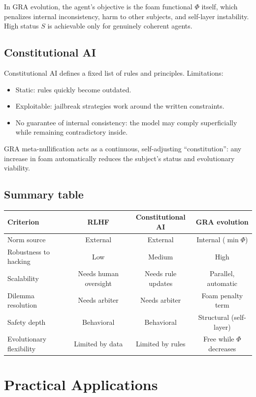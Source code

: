 \documentclass[11pt,a4paper]{article}
\begin{document}
In GRA evolution, the agent's objective is the foam functional $\Phi$ itself, which penalizes internal inconsistency, harm to other subjects, and self-layer instability.
High status $S$ is achievable only for genuinely coherent agents.

\subsection{Constitutional AI}

Constitutional AI defines a fixed list of rules and principles.
Limitations:
\begin{itemize}
\item Static: rules quickly become outdated.
\item Exploitable: jailbreak strategies work around the written constraints.
\item No guarantee of internal consistency: the model may comply superficially while remaining contradictory inside.
\end{itemize}

GRA meta-nullification acts as a continuous, self-adjusting ``constitution'': any increase in foam automatically reduces the subject's status and evolutionary viability.

\subsection{Summary table}

\begin{center}
\begin{tabular}{l|c|c|c}
Criterion & RLHF & Constitutional AI & GRA evolution \\\hline
Norm source & External & External & Internal ($\min\Phi$) \\
Robustness to hacking & Low & Medium & High \\
Scalability & Needs human oversight & Needs rule updates & Parallel, automatic \\
Dilemma resolution & Needs arbiter & Needs arbiter & Foam penalty term \\
Safety depth & Behavioral & Behavioral & Structural (self-layer) \\
Evolutionary flexibility & Limited by data & Limited by rules & Free while $\Phi$ decreases \\
\end{tabular}
\end{center}

\section{Practical Applications}
\end{document}
